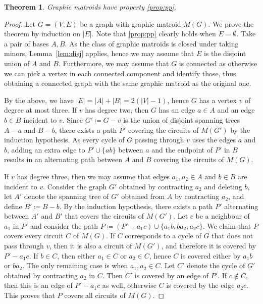 \documentclass[11pt,a4paper]{article}
\theoremstyle{plain}
\newtheorem{thm}{Theorem}
\theoremstyle{definition}
\begin{document}
\begin{thm} \label{thm:graphic} 
Graphic matroids have property \ref{prop:pp}.
\end{thm}
\begin{proof}
Let $G=(V,E)$ be a graph with graphic matroid $M(G)$. We prove the theorem by induction on $|E|$. Note that \ref{prop:pp} clearly holds when $E=\emptyset$. Take a pair of bases $A,B$. As the class of graphic matroids is closed under taking minors, Lemma~\ref{lem:disj} applies, hence we may assume that $E$ is the disjoint union of $A$ and $B$. Furthermore, we may assume that $G$ is connected as otherwise we can pick a vertex in each connected component and identify those, thus obtaining a connected graph with the same graphic matroid as the original one. 

By the above, we have $|E|=|A|+|B| = 2(|V|-1)$, hence $G$ has a vertex $v$ of degree at most three. If $v$ has degree two, then $G$ has an edge $a \in A$ and an edge $b \in B$ incident to $v$. Since $G' \coloneqq G-v$ is the union of disjoint spanning trees $A-a$ and $B-b$, there exists a path $P'$ covering the circuits of $M(G')$ by the induction hypothesis. As every cycle of $G$ passing through $v$ uses the edges $a$ and $b$, adding an extra edge to $P'\cup \{ab\}$ between $a$ and the endpoint of $P'$ in $B$ results in an alternating path between $A$ and $B$ covering the circuits of $M(G)$.

If $v$ has degree three, then we may assume that edges $a_1, a_2 \in A$ and $b \in B$ are incident to $v$. Consider the graph $G'$ obtained by contracting $a_2$ and deleting $b$, let $A'$ denote the spanning tree of $G'$ obtained from $A$ by contracting $a_2$, and define $B'\coloneqq B-b$. By the induction hypothesis, there exists a path $P'$ alternating between $A'$ and $B'$ that covers the circuits of $M(G')$. Let $c$ be a neighbour of $a_1$ in $P'$ and consider the path $P \coloneqq (P'-a_1c)\cup\{a_1b,ba_2,a_2c\}$. We claim that $P$ covers every circuit $C$ of $M(G)$. If $C$ corresponds to a cycle of $G$ that does not pass through $v$, then it is also a circuit of $M(G')$, and therefore it is covered by $P'-a_1c$. If $b \in C$, then either $a_1 \in C$ or $a_2 \in C$, hence $C$ is covered either by $a_1b$ or $ba_2$. The only remaining case is when $a_1, a_2 \in C$. Let $C'$ denote the cycle of $G'$ obtained by contracting $a_2$ in $C$. Then $C'$ is covered by an edge of $P'$. If $c \not\in C$, then this is an edge of $P'-a_1c$ as well, otherwise $C$ is covered by the edge $a_2c$. This proves that $P$ covers all circuits of $M(G)$.
\end{proof}
\end{document}

